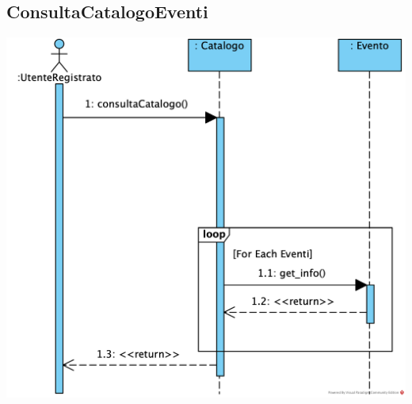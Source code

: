 \vspace{2ex}

{\small
\subsection{ConsultaCatalogoEventi}

\begin{center}

\includegraphics[height=0.38\textheight]{assets/casid'uso/ConsultaCatalogoEventi.png}

\vspace{1ex}
\end{center}
}

